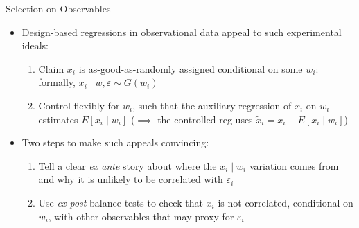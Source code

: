 \documentclass[11pt,english]{beamer}
\begin{document}
\begin{frame}{Selection on Observables}
\begin{itemize}
\item Design-based regressions in observational data appeal to such experimental ideals:\smallskip
\begin{enumerate}
\item Claim $x_i$ is as-good-as-randomly assigned conditional on some $w_i$: formally, $x_i \mid w,\varepsilon \sim G(w_i)$\smallskip\pause{}
\item Control flexibly for $w_i$, such that the auxiliary regression of $x_i$ on $w_i$ estimates $E[x_i\mid w_i]$ ($\implies$ the controlled reg uses $\tilde{x}_i=x_i-E[x_i\mid w_i]$)
\end{enumerate}\bigskip\pause{}
\item Two steps to make such appeals convincing: \smallskip\pause{}
\begin{enumerate}
\item Tell a clear \emph{ex ante} story about where the $x_i\mid w_i$ variation comes from and why it is unlikely to be correlated with $\varepsilon_i$\smallskip\pause{}
\item Use \emph{ex post} balance tests to check that $x_i$ is not correlated, conditional on $w_i$, with other observables that may proxy for $\varepsilon_i$
\end{enumerate}
\end{itemize}
\end{frame}
\end{document}
